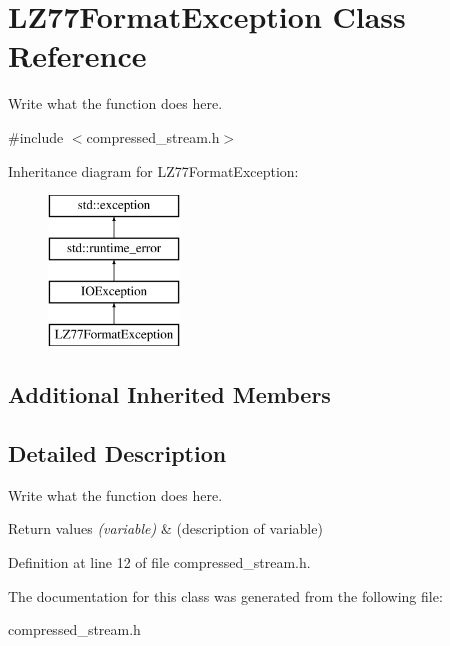 \hypertarget{classLZ77FormatException}{\section{L\+Z77\+Format\+Exception Class Reference}
\label{classLZ77FormatException}
}


Write what the function does here.  




{\ttfamily \#include $<$compressed\+\_\+stream.\+h$>$}

Inheritance diagram for L\+Z77\+Format\+Exception\+:\begin{figure}[H]
\begin{center}
\leavevmode
\includegraphics[height=4.000000cm]{classLZ77FormatException}
\end{center}
\end{figure}
\subsection*{Additional Inherited Members}


\subsection{Detailed Description}
Write what the function does here. 


\begin{DoxyRetVals}{Return values}
{\em (variable)} & (description of variable) \\
\hline
\end{DoxyRetVals}


Definition at line 12 of file compressed\+\_\+stream.\+h.



The documentation for this class was generated from the following file\+:\begin{DoxyCompactItemize}
\item 
compressed\+\_\+stream.\+h\end{DoxyCompactItemize}
